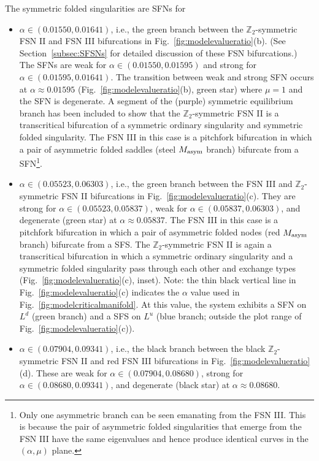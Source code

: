 \documentclass[10pt,onecolumn]{article}
\theoremstyle{plain}
\begin{document}
The symmetric folded singularities are SFNs for 
\begin{itemize}
\setlength{\itemsep}{0pt}
\item $\alpha \in (0.01550, 0.01641)$, i.e., the green branch between the $\mathbb Z_2$-symmetric FSN II and FSN III bifurcations in Fig.~\ref{fig:modelevalueratio}(b). 
(See Section~\ref{subsec:SFSNs} for detailed discussion of these FSN bifurcations.) 
The SFNs are weak for $\alpha \in (0.01550, 0.01595)$ and strong for $\alpha \in (0.01595, 0.01641)$. 
The transition between weak and strong SFN occurs at $\alpha \approx 0.01595$ (Fig.~\ref{fig:modelevalueratio}(b), green star) where $\mu = 1$ and the SFN is degenerate. 
A segment of the (purple) symmetric equilibrium branch has been included to show that the $\mathbb Z_2$-symmetric FSN II is a transcritical bifurcation of a symmetric ordinary singularity and symmetric folded singularity. 
The FSN III in this case is a pitchfork bifurcation in which a pair of asymmetric folded saddles (steel $M_{\rm asym}$ branch) bifurcate from a SFN\footnote{Only one asymmetric branch can be seen emanating from the FSN III. This is because the pair of asymmetric folded singularities that emerge from the FSN III have the same eigenvalues and hence produce identical curves in the $(\alpha,\mu)$ plane.}.
\item $\alpha \in (0.05523,0.06303)$, i.e., the green branch between the FSN III and $\mathbb Z_2$-symmetric FSN II bifurcations in Fig.~\ref{fig:modelevalueratio}(c). 
They are strong for $\alpha \in (0.05523,0.05837)$, weak for $\alpha \in (0.05837,0.06303)$, and degenerate (green star) at $\alpha \approx 0.05837$.
The FSN III in this case is a pitchfork bifurcation in which a pair of asymmetric folded nodes (red $M_{\rm asym}$ branch) bifurcate from a SFS. 
The $\mathbb Z_2$-symmetric FSN II is again a transcritical bifurcation in which a symmetric ordinary singularity and a symmetric folded singularity pass through each other and exchange types (Fig.~\ref{fig:modelevalueratio}(c), inset). Note: the thin black vertical line in Fig.~\ref{fig:modelevalueratio}(c) indicates the $\alpha$ value used in Fig.~\ref{fig:modelcriticalmanifold}. At this value, the system exhibits a SFN on $L^d$ (green branch) and a SFS on $L^u$ (blue branch; outside the plot range of Fig.~\ref{fig:modelevalueratio}(c)).
\item $\alpha \in (0.07904,0.09341)$, i.e., the black branch between the black $\mathbb Z_2$-symmetric FSN II and red FSN III bifurcations in Fig.~\ref{fig:modelevalueratio}(d). 
These are weak for $\alpha \in (0.07904,0.08680)$, strong for $\alpha \in (0.08680,0.09341)$, and degenerate (black star) at $\alpha \approx 0.08680$.

\end{itemize}
\end{document}
